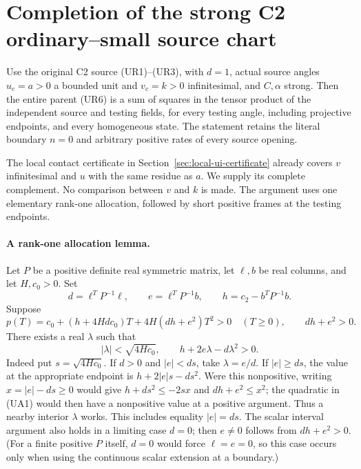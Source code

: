 \section{Completion of the strong C2 ordinary--small source chart}
\label{sec:ui-all-tests-recovered}

\begin{theorem}
Use the original C2 source (UR1)--(UR3), with $d=1$, actual source
angles $u_c=a>0$ a bounded unit and $v_c=k>0$ infinitesimal, and
$C,\alpha$ strong. Then the entire parent (UR6) is a sum of squares
in the tensor product of the independent source and testing fields,
for every testing angle, including projective endpoints, and every
homogeneous state. The statement retains the literal boundary $n=0$
and arbitrary positive rates of every source opening.
\end{theorem}

The local contact certificate in Section~\ref{sec:local-ui-certificate}
already covers $v$ infinitesimal and $u$ with the same residue as $a$.
We supply its complete complement. No comparison between $v$ and $k$
is made. The argument uses one elementary rank-one allocation, followed
by short positive frames at the testing endpoints.

\paragraph{A rank-one allocation lemma.}
Let $P$ be a positive definite real symmetric matrix, let $\ell,b$ be
real columns, and let $H,c_0>0$. Set
\[
 d=\ell^TP^{-1}\ell,\qquad e=\ell^TP^{-1}b,\qquad
 h=c_2-b^TP^{-1}b.
\]
Suppose
\[
 p(T)=c_0+(h+4Hdc_0)T+4H(dh+e^2)T^2>0\quad(T\ge0),
 \qquad dh+e^2>0.                                      \tag{UA1}
\]
There exists a real $\lambda$ such that
\[
 |\lambda|<\sqrt{4Hc_0},\qquad
 h+2e\lambda-d\lambda^2>0.                             \tag{UA2}
\]
Indeed put $s=\sqrt{4Hc_0}$. If $d>0$ and $|e|<ds$, take
$\lambda=e/d$. If $|e|\ge ds$, the value at the appropriate endpoint
is $h+2|e|s-ds^2$. Were this nonpositive, writing
$x=|e|-ds\ge0$ would give
$h+ds^2\le-2sx$ and $dh+e^2\le x^2$; the quadratic in (UA1)
would then have a nonpositive value at a positive argument. Thus a
nearby interior $\lambda$ works. This includes equality $|e|=ds$.
The scalar interval argument also holds in a limiting case $d=0$;
then $e\ne0$ follows from $dh+e^2>0$. (For a finite positive $P$
itself, $d=0$ would force $\ell=e=0$, so this case occurs only
when using the continuous scalar extension at a boundary.)

